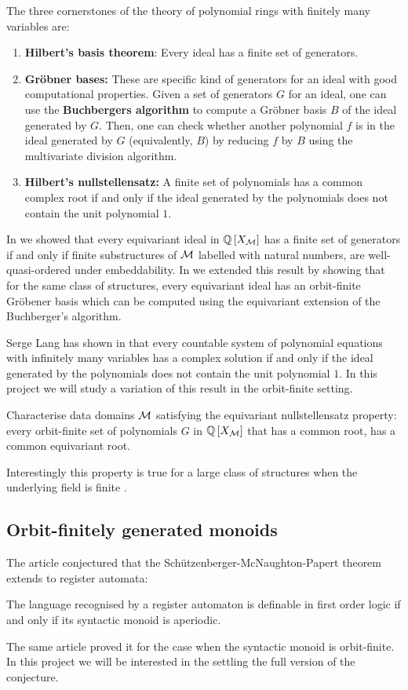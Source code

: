 \documentclass[a4paper,11pt]{article}
\begin{document}
The three cornerstones of the theory of polynomial rings with finitely many variables are:
\begin{enumerate}
\item \textbf{Hilbert's basis theorem}: Every ideal has a finite set of generators.
\item \textbf{Gr\"{o}bner bases:} These are specific kind of generators for an ideal with good computational properties.
Given a set of generators $G$ for an ideal,
one can use the \textbf{Buchbergers algorithm} to compute a Gr\"{o}bner basis $B$ of the ideal generated by $G$.
Then, one can check whether another polynomial $f$ is in the ideal generated by $G$ (equivalently, $B$) by reducing $f$ by $B$ using the multivariate division algorithm.
\item \textbf{Hilbert's nullstellensatz:} A finite set of polynomials has a common complex root if and only if the ideal generated by the polynomials does not contain the unit polynomial $1$.
\end{enumerate}
%
In  we showed that every equivariant ideal in $\mathbb{Q}\left[X_{\mathcal{M}}\right]$ has a finite set of generators if and only if finite substructures of $\mathcal{M}$ labelled with natural numbers, are well-quasi-ordered under embeddability.
In  we extended this result by showing that for the same class of structures,
every equivariant ideal has an orbit-finite Gr\"{o}bener basis which can be computed using the equivariant extension of the Buchberger's algorithm.

Serge Lang has shown in \cite{Lang52} that every countable system of polynomial equations with infinitely many variables has a complex solution if and only if the ideal generated by the polynomials does not contain the unit polynomial $1$.
In this project we will study a variation of this result in the orbit-finite setting.
\begin{question}
Characterise data domains $\mathcal{M}$ satisfying the equivariant nullstellensatz property:
every orbit-finite set of polynomials $G$ in $\mathbb{Q}\left[X_{\mathcal{M}}\right]$ that has a common root,
has a common equivariant root.
\end{question}
%
Interestingly this property is true for a large class of structures when the underlying field is finite \cite{Prz20}.%
\subsection{Orbit-finitely generated monoids}\label{sec:ofmon}
%
The article \cite{nomMon} conjectured that the Sch\"{u}tzenberger-McNaughton-Papert theorem extends to register automata:
\begin{conjecture}
The language recognised by a register automaton is definable in first order logic if and only if its syntactic monoid is aperiodic.
\end{conjecture}
The same article proved it for the case when the syntactic monoid is orbit-finite.
In this project we will be interested in the settling the full version of the conjecture.
\end{document}
